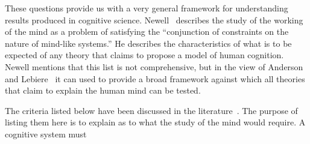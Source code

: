 These questions provide us with a very general framework for
understanding results produced in cognitive
science. Newell~\cite{Newell1980135} describes the study of the
working of the mind as a problem of satisfying the ``conjunction of
constraints on the nature of mind-like systems.'' He describes the
characteristics of what is to be expected of any theory that claims to
propose a model of human cognition. Newell mentions that this list is
not comprehensive, but in the view of Anderson and
Lebiere~\cite{CambridgeJournals:207162} it can used to provide a broad
framework against which all theories that claim to explain the human
mind can be tested.
 
The criteria listed below have been discussed in the
literature~\cite{CambridgeJournals:207162,Newell:1990aa}. The purpose
of listing them here is to explain as to what the study of the mind
would require.  A cognitive system must

